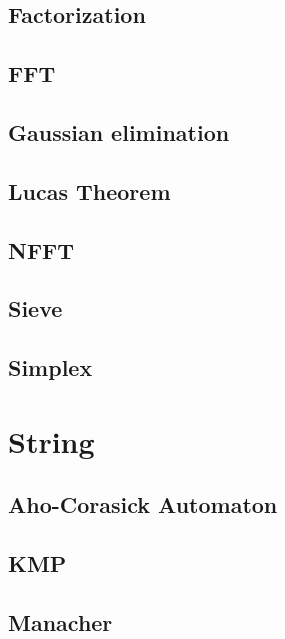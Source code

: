 \subsection{Factorization}
\raggedbottom
\subsection{FFT}
\raggedbottom
\subsection{Gaussian elimination}
\raggedbottom
\subsection{Lucas Theorem}
\raggedbottom
\subsection{NFFT}
\raggedbottom
\subsection{Sieve}
\raggedbottom
\subsection{Simplex}
\raggedbottom


\section{String}
\subsection{Aho-Corasick Automaton}
\raggedbottom
\subsection{KMP}
\raggedbottom
\subsection{Manacher}
\raggedbottom
